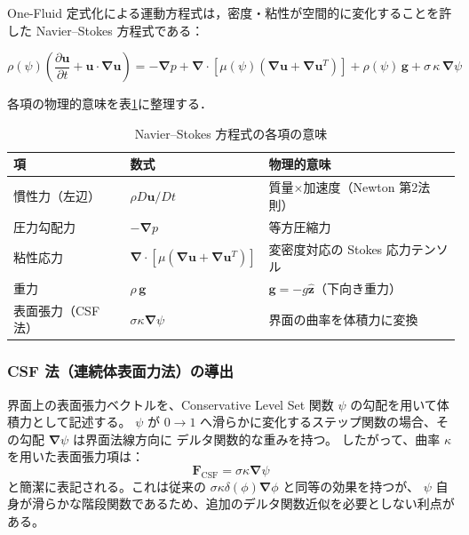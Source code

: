\documentclass[12pt, a4paper, titlepage, xelatex, ja=standard]{bxjsarticle}
\newcommand{\pd}[2]{\dfrac{\partial #1}{\partial #2}}
\newcommand{\bu}{\bm{u}}
\newcommand{\bg}{\bm{g}}
\newcommand{\bnabla}{\bm{\nabla}}
\begin{document}
One-Fluid 定式化による運動方程式は，密度・粘性が空間的に変化することを許した
Navier--Stokes 方程式である：

\begin{tcolorbox}[mybox, title={One-Fluid Navier--Stokes 方程式（次元形）}]
\begin{equation}
  \rho(\psi)\!\left(\pd{\bu}{t} + \bu\cdot\bnabla\bu\right)
  = -\bnabla p
  + \bnabla\cdot\!\left[\mu(\psi)\!\left(\bnabla\bu + \bnabla\bu^T\right)\right]
  + \rho(\psi)\,\bg
  + \sigma\,\kappa\,\bnabla \psi
  \label{eq:NS_dim}
\end{equation}
\end{tcolorbox}

各項の物理的意味を表\ref{tab:NS_terms}に整理する．

\begin{table}[h]
\centering
\caption{Navier--Stokes 方程式の各項の意味}
\label{tab:NS_terms}
\begin{tabular}{@{}lll@{}}
\toprule
項 & 数式 & 物理的意味\\
\midrule
慣性力（左辺） & $\rho D\bu/Dt$ & 質量$\times$加速度（Newton 第2法則）\\
圧力勾配力 & $-\bnabla p$ & 等方圧縮力\\
粘性応力 & $\bnabla\cdot[\mu(\bnabla\bu+\bnabla\bu^T)]$ & 変密度対応の Stokes 応力テンソル\\
重力 & $\rho\,\bg$ & $\bg = -g\hat{\bm{z}}$（下向き重力）\\
表面張力（CSF法） & $\sigma\kappa\bnabla\psi$ & 界面の曲率を体積力に変換 \cite{Olsson2005}\\
\bottomrule
\end{tabular}
\end{table}

\subsubsection{CSF 法（連続体表面力法）の導出}

界面上の表面張力ベクトルを、Conservative Level Set 関数 $\psi$ の勾配を用いて体積力として記述する。
$\psi$ が $0 \to 1$ へ滑らかに変化するステップ関数の場合、その勾配 $\bnabla \psi$ は界面法線方向に
デルタ関数的な重みを持つ。
したがって、曲率 $\kappa$ を用いた表面張力項は：
\begin{equation}
  \bm{F}_{\mathrm{CSF}} = \sigma\kappa\bnabla\psi
\end{equation}
と簡潔に表記される。これは従来の $\sigma\kappa\delta(\phi)\bnabla\phi$ と同等の効果を持つが、
$\psi$ 自身が滑らかな階段関数であるため、追加のデルタ関数近似を必要としない利点がある。
\end{document}
